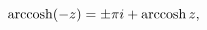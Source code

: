 \[\mathop{\mathrm{arccosh}\/}\nolimits\!\left(-z\right)=\pm\pi i+\mathop{\mathrm%
{arccosh}\/}\nolimits z,\]